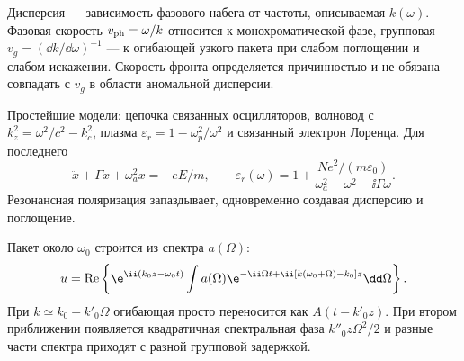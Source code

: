 
Дисперсия — зависимость фазового набега от частоты, описываемая $k(\omega)$. Фазовая скорость $v_{\rm ph}=\omega/k$ относится к монохроматической фазе, групповая $v_g=(\dd k/\dd\omega)^{-1}$ — к огибающей узкого пакета при слабом поглощении и слабом искажении. Скорость фронта определяется причинностью и не обязана совпадать с $v_g$ в области аномальной дисперсии.

Простейшие модели: цепочка связанных осцилляторов, волновод с $k_z^2=\omega^2/c^2-k_c^2$, плазма $\varepsilon_r=1-\omega_p^2/\omega^2$ и связанный электрон Лоренца. Для последнего
\begin{equation}
 \ddot x+\Gamma\dot x+\omega_a^2x=-eE/m,
 \qquad \varepsilon_r(\omega)=1+\frac{Ne^2/(m\varepsilon_0)}{\omega_a^2-\omega^2-\ii\Gamma\omega}.
\end{equation}
Резонансная поляризация запаздывает, одновременно создавая дисперсию и поглощение.

Пакет около $\omega_0$ строится из спектра $a(\Omega)$:
\begin{equation}
 u=\operatorname{Re}\left\{\e^{\ii(k_0z-\omega_0t)}
 \int a(\Omega)\e^{-\ii\Omega t+\ii[k(\omega_0+\Omega)-k_0]z}\dd\Omega\right\}.
\end{equation}
При $k\simeq k_0+k'_0\Omega$ огибающая просто переносится как $A(t-k'_0z)$. При втором приближении появляется квадратичная спектральная фаза $k''_0z\Omega^2/2$ и разные части спектра приходят с разной групповой задержкой.
